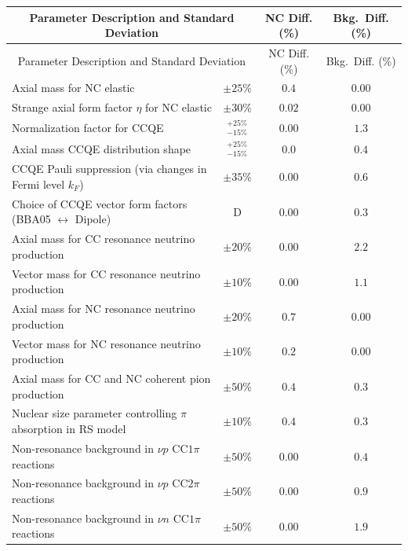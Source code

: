 \singlespacing
\begin{longtable}{p{3.25in} c c c}
  \hline\hline
  \multicolumn{2}{c}{Parameter Description and Standard Deviation} & NC Diff. (\%) & Bkg.~Diff. (\%) \\
  \hline \endfirsthead
  \hline\hline
  \multicolumn{2}{c}{Parameter Description and Standard Deviation} & NC Diff. (\%) & Bkg.~Diff. (\%) \\
  \hline \endhead
  Axial mass for NC elastic & $\pm25\%$ & $0.4$ & $0.00$ \\
  Strange axial form factor $\eta$ for NC elastic & $\pm30\%$ & $0.02$ & $0.00$ \\
  Normalization factor for CCQE & $^{+25\%}_{-15\%}$ & $0.00$ & $1.3$ \\
  Axial mass CCQE distribution shape & $^{+25\%}_{-15\%}$ & $0.0$ & $0.4$ \\
  CCQE Pauli suppression (via changes in Fermi level $k_F$) & $\pm35\%$ & $0.00$ & $0.6$ \\
  Choice of CCQE vector form factors \newline (BBA05 $\leftrightarrow$ Dipole) & D & $0.00$ & $0.3$ \\
  Axial mass for CC resonance neutrino production & $\pm20\%$ & $0.00$ & $2.2$ \\
  Vector mass for CC resonance neutrino \newline production & $\pm10\%$ & $0.00$ & $1.1$ \\
  Axial mass for NC resonance neutrino production & $\pm20\%$ & $0.7$ & $0.00$ \\
  Vector mass for NC resonance neutrino production & $\pm10\%$ & $0.2$ & $0.00$ \\
  Axial mass for CC and NC coherent pion \newline production & $\pm50\%$ & $0.4$ & $0.3$ \\
  Nuclear size parameter controlling $\pi$ absorption \newline in RS model & $\pm10\%$ & $0.4$ & $0.3$ \\
  Non-resonance background in $\nu p$ CC$1\pi$ reactions & $\pm50\%$ & $0.00$ & $0.4$ \\
  Non-resonance background in $\nu p$ CC$2\pi$ reactions & $\pm50\%$ & $0.00$ & $0.9$ \\
  Non-resonance background in $\nu n$ CC$1\pi$ reactions & $\pm50\%$ & $0.00$ & $1.9$ \\

\end{longtable}
